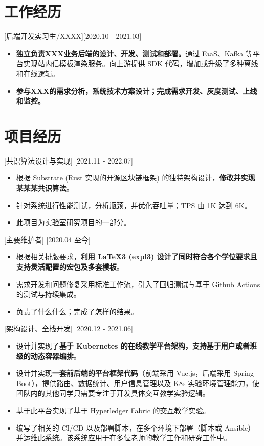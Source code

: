\documentclass{resume}
\begin{document}
\section{工作经历}

[后端开发实习生/XXXX][2020.10 - 2021.03] 
\begin{itemize}
  \item \textbf{独立负责XXX业务后端的设计、开发、测试和部署。}通过 FaaS、Kafka 等平台实现站内信模板渲染服务。向上游提供 SDK 代码，增加或升级了多种离线和在线逻辑。
  \item \textbf{参与XXX的需求分析，系统技术方案设计；完成需求开发、灰度测试、上线和监控。}
\end{itemize}

\section{项目经历}

[共识算法设计与实现]
[2021.11 - 2022.07] 

\begin{itemize}
  \item 根据 Substrate (Rust 实现的开源区块链框架) 的独特架构设计，\textbf{修改并实现某某某共识算法}。
  \item 针对系统进行性能测试，分析瓶颈，并优化吞吐量；TPS 由 1K 达到 6K。
  \item 此项目为实验室研究项目的一部分。
\end{itemize}

[主要维护者]
[2020.04 至今]

\begin{itemize}
  \item 根据相关排版要求，\textbf{利用 LaTeX3 (expl3) 设计了同时符合各个学位要求且支持灵活配置的宏包及多套模板}。
  \item 需求开发和问题修复采用标准工作流，引入了回归测试与基于 Github Actions 的测试与持续集成。
  \item 负责了什么什么；完成了怎样的结果。
\end{itemize}


[架构设计、全栈开发]
[2020.12 - 2021.06] 

\begin{itemize}
  \item 设计并实现了\textbf{基于 Kubernetes 的在线教学平台架构，支持基于用户或者班级的动态容器编排}。
  \item 设计并实现\textbf{一套前后端的平台框架代码}（前端采用 Vue.js，后端采用 Spring Boot），提供路由、数据统计、用户信息管理以及 K8s 实验环境管理能力，使团队内的其他同学只需要专注于开发具体交互教学实验逻辑。
  \item 基于此平台实现了基于 Hyperledger Fabric 的交互教学实验。
  \item 编写了相关的 CI/CD 以及部署脚本，在多个环境下部署（脚本或 Ansible）并运维此系统。该系统应用于在多位老师的教学工作和研究工作中。
\end{itemize}
\end{document}
